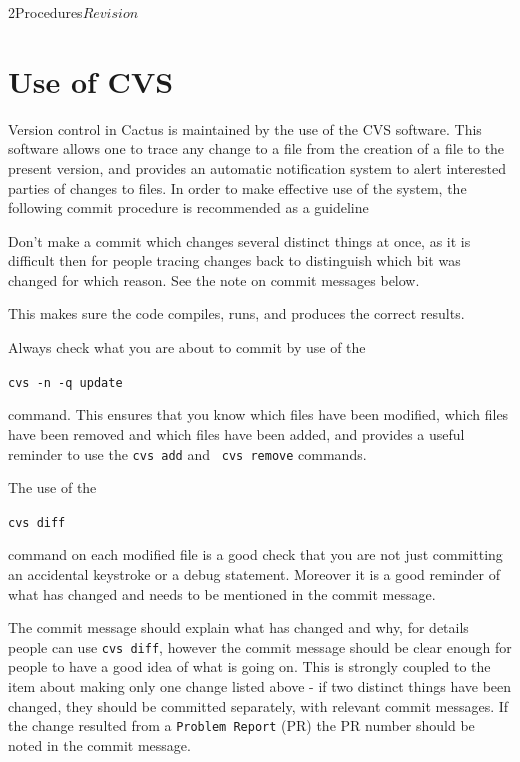 
\begin{cactuspart}{2}{Procedures}{}{$Revision$}
\renewcommand{\thepage}{\Alph{part}\arabic{page}}


\chapter{Use of CVS} 

Version control in Cactus is maintained by the use of the CVS
software.  This software allows one to trace any change to a file from 
the creation of a file to the present version, and provides an
automatic notification system to alert interested parties of changes
to files.  In order to make effective use of the system, the following 
commit procedure is recommended as a guideline

\begin{Lentry}
\item[{\em Only make one change at a time}]
Don't make a commit which changes several distinct things at once, as
it is difficult then for people tracing changes back to distinguish
which bit was changed for which reason.  See the note on commit
messages below.
\item[{\em Run the test suite}]
This makes sure the code compiles, runs, and produces the correct results. 
\item[{\em Know which files you are going to commit}]
Always check what you are about to commit by use of the

{\tt cvs -n -q update} 

command.  This ensures that you know which files have been modified,
which files have been removed and which files have been added, and
provides a useful reminder to use the {\tt \verb.cvs add.} and {\tt
\verb.cvs remove.} commands.
\item[{\em Know what has changed}]
The use of the

{\tt cvs diff} 

command on each modified file is a good check that you are not just
committing an accidental keystroke or a debug statement.  Moreover it
is a good reminder of what has changed and needs to be mentioned in
the commit message.
\item[{\em Provide clear and meaningful and relevant commit messages}]
The commit message should explain what has changed and why, for
details people can use {\tt \verb.cvs diff.}, however the commit
message should be clear enough for people to have a good idea of what
is going on.  This is strongly coupled to the item about making only
one change listed above - if two distinct things have been changed,
they should be committed separately, with relevant commit messages.
If the change resulted from a {\tt Problem Report} (PR) the PR number
should be noted in the commit message.
\end{Lentry}


\end{cactuspart}
